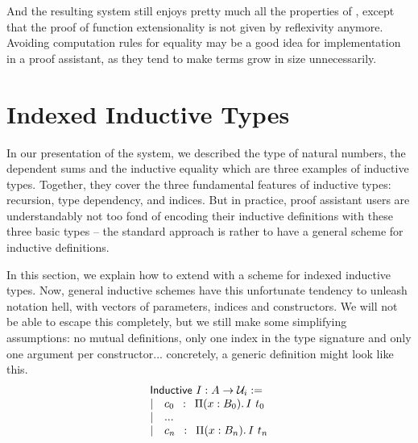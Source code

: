 And the resulting system still enjoys pretty much all the properties of 
\SetoidCC, except that the proof of function extensionality is not given by 
reflexivity anymore.
% 
Avoiding computation rules for equality may be a good idea for implementation 
in a proof assistant, as they tend to make terms grow in size unnecessarily.

\section{Indexed Inductive Types}
\label{sec:general-inductives}

In our presentation of the system, we described the type of natural numbers, 
% 
% 
the dependent sums and the inductive equality which are three examples of
inductive types.
% 
Together, they cover the three fundamental features of inductive types: 
recursion, type dependency, and indices. 
% 
But in practice, proof assistant users are understandably not too fond
of encoding their inductive definitions with these three basic types -- 
the standard approach is rather to have a general scheme for inductive 
definitions.

In this section, we explain how to extend \SetoidCC with a scheme for indexed 
inductive types.
% 
Now, general inductive schemes have this unfortunate tendency to unleash 
notation hell, with vectors of parameters, indices and constructors. 
% 
We will not be able to escape this completely, but we still make some 
simplifying assumptions:
% 
no mutual definitions, only one index in the type signature and only one 
argument per constructor... concretely, a generic definition might look like this.
\[
\begin{array}{l}
\mathsf{Inductive}\ I : A \to \mathcal{U}_i := \\
| \quad c_0 \enskip : \enskip \Pi (x : B_0).\, {I\ t_0}\\
| \quad ... \\
| \quad c_n \enskip : \enskip \Pi (x : B_n).\, {I\ t_n}
\end{array}
\]

